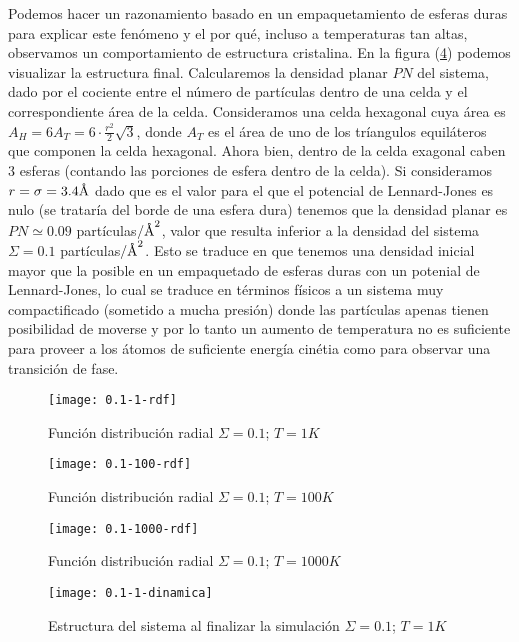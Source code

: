 Podemos hacer un razonamiento basado en un empaquetamiento de esferas duras para explicar este fenómeno y el por qué, incluso a temperaturas tan altas, observamos un comportamiento de estructura cristalina. En la figura (\ref{dinamica_0.1-1}) podemos visualizar la estructura final. Calcularemos la densidad planar $PN$ del sistema, dado por el cociente entre el número de partículas dentro de una celda y el correspondiente área de la celda. Consideramos una celda hexagonal cuya área es $A_H = 6A_T = 6 \cdot \frac{r^2}{2} \sqrt{3}$, donde $A_T$ es el área de uno de los tríangulos equiláteros que componen la celda hexagonal. Ahora bien, dentro de la celda exagonal caben 3 esferas (contando las porciones de esfera dentro de la celda). Si consideramos $r = \sigma = 3.4 \textup{\r{A}}$ dado que es el valor para el que el potencial de Lennard-Jones es nulo (se trataría del borde de una esfera dura) tenemos que la densidad planar es $PN \simeq 0.09$ partículas$/\textup{\r{A}}^2$, valor que resulta inferior a la densidad del sistema $\Sigma=0.1$ partículas$/\textup{\r{A}}^2$. Esto se traduce en que tenemos una densidad inicial mayor que la posible en un empaquetado de esferas duras con un potenial de Lennard-Jones, lo cual se traduce en términos físicos a un sistema muy compactificado (sometido a mucha presión) donde las partículas apenas tienen posibilidad de moverse y por lo tanto un aumento de temperatura no es suficiente para proveer a los átomos de suficiente energía cinétia como para observar una transición de fase.

\begin{figure}[t]
	\texttt{[image: 0.1-1-rdf]}
	\caption{Función distribución radial $\Sigma=0.1$; $T=1K$}
	\label{rdf_0.1-1}
\end{figure}

\begin{figure}[t]
	\texttt{[image: 0.1-100-rdf]}
	\caption{Función distribución radial $\Sigma=0.1$; $T=100K$}
	\label{rdf_0.1-100}
\end{figure}

\begin{figure}[t]
	\texttt{[image: 0.1-1000-rdf]}
	\caption{Función distribución radial $\Sigma=0.1$; $T=1000K$}
	\label{rdf_0.1-1000}
\end{figure}

\begin{figure}[t]
	\texttt{[image: 0.1-1-dinamica]}
	\caption{Estructura del sistema al finalizar la simulación $\Sigma=0.1$; $T=1K$}
	\label{dinamica_0.1-1}
\end{figure}

